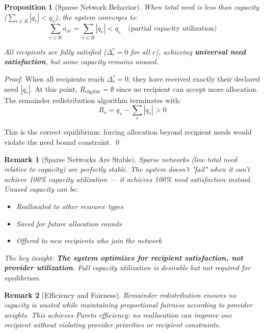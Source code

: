 \documentclass[11pt]{article}
\newtheorem{proposition}{Proposition}
\newtheorem{remark}{Remark}
\begin{document}
\begin{proposition}[Sparse Network Behavior]
\label{prop:sparse-network}
When total need is less than capacity ($\sum_{r \in R} |q_r| < q_s$), the system converges to:
\[
\sum_{r \in R} a_{sr} = \sum_{r \in R} |q_r| < q_s \quad \text{(partial capacity utilization)}
\]

All recipients are fully satisfied ($\Delta_r^\tau = 0$ for all $r$), achieving \textbf{universal need satisfaction}, but some capacity remains unused.
\end{proposition}

\begin{proof}
When all recipients reach $\Delta_r^\tau = 0$, they have received exactly their declared need $|q_r|$. At this point, $R_{\text{eligible}} = \emptyset$ since no recipient can accept more allocation. The remainder redistribution algorithm terminates with:
\[
R_s = q_s - \sum_r |q_r| > 0
\]

This is the correct equilibrium: forcing allocation beyond recipient needs would violate the need bound constraint. \qed
\end{proof}

\begin{remark}[Sparse Networks Are Stable]
Sparse networks (low total need relative to capacity) are perfectly stable. The system doesn't "fail" when it can't achieve 100\% capacity utilization — it achieves 100\% need satisfaction instead. Unused capacity can be:
\begin{itemize}
\item Reallocated to other resource types
\item Saved for future allocation rounds
\item Offered to new recipients who join the network
\end{itemize}

The key insight: \textbf{The system optimizes for recipient satisfaction, not provider utilization}. Full capacity utilization is desirable but not required for equilibrium.
\end{remark}

\begin{remark}[Efficiency and Fairness]
Remainder redistribution ensures no capacity is wasted while maintaining proportional fairness according to provider weights. This achieves Pareto efficiency: no reallocation can improve one recipient without violating provider priorities or recipient constraints.
\end{remark}
\end{document}
